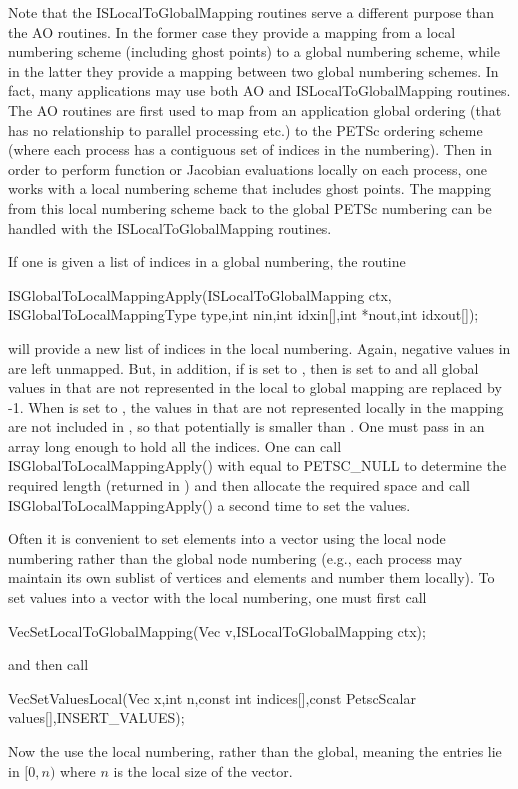 Note that the ISLocalToGlobalMapping routines serve a different purpose
than the AO routines. In the former case they provide a mapping 
from  a local numbering scheme (including ghost points) to a global numbering scheme,
while in the latter they provide a mapping between two global numbering schemes.
In fact, many applications may use both AO and ISLocalToGlobalMapping routines.
The AO routines are first used to map from an application global ordering 
(that has no relationship to parallel processing etc.) to the PETSc ordering scheme
(where each process has a contiguous set of indices in the numbering). Then in order
to perform function or Jacobian evaluations locally on each process, one works
with a local numbering scheme that includes ghost points.  The mapping from this local
numbering scheme back to the global PETSc numbering can be handled with the 
ISLocalToGlobalMapping routines.

If one is given a list of indices in a global numbering, the routine
\begin{tabbing}
  ISGlobalToLocalMappingApply(ISLocalToGlobalMapping ctx,\\
                              ISGlobalToLocalMappingType type,int nin,int idxin[],int *nout,int idxout[]);
\end{tabbing}
 will provide
a new list of indices in the local numbering. Again, negative values in 
 are left unmapped.  But, in addition, if  is set to 
, 
then  is set to  and all global values
in  that are not represented in the local to global mapping
are replaced by -1. When  is set to ,
 the values in  that are not
represented locally in the mapping are not included in , so that
potentially  is smaller than .  One must
pass in an array long enough to hold all the indices. One can call
ISGlobalToLocalMappingApply() with  equal to 
PETSC_NULL to determine the required length (returned in 
) and then allocate the required space and call 
ISGlobalToLocalMappingApply() a second time to set the values.

Often it is convenient to set elements into a vector using the local node 
numbering rather than the global node numbering (e.g.,  each process may
maintain its own sublist of vertices and elements and number them locally).
To set values into a vector with the local numbering, one must first call
\begin{tabbing}
  VecSetLocalToGlobalMapping(Vec v,ISLocalToGlobalMapping ctx);
\end{tabbing}
and then call 
\begin{tabbing}
  VecSetValuesLocal(Vec x,int n,const int indices[],const PetscScalar values[],INSERT_VALUES);
\end{tabbing}
Now the  use the local numbering, rather than the global, meaning
the entries lie in $[0,n)$ where $n$ is the local size of the vector.

